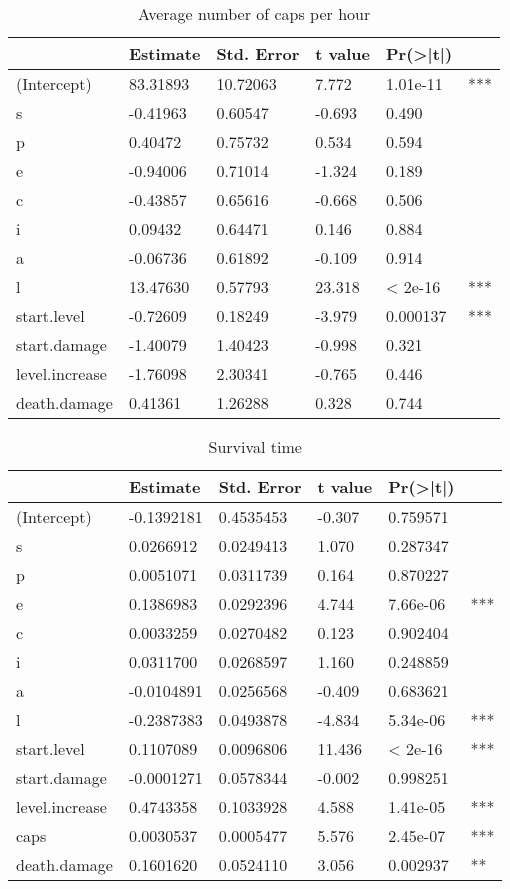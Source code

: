 \begin{table}
\caption{Average number of caps per hour}
\label{table:caps}
\begin{tabular}{l|lllll}
&Estimate&Std. Error&t value&Pr(>|t|)&\\  
\hline  
(Intercept)&83.31893  & 10.72063 &  7.772 &1.01e-11& ***\\
s &-0.41963  &  0.60547 & -0.693 &   0.490 &   \\
p& 0.40472  &  0.75732  & 0.534 &   0.594 &   \\
e & -0.94006  &  0.71014  &-1.324 &   0.189 &   \\
c&-0.43857  &  0.65616&  -0.668  &  0.506 &   \\
i& 0.09432  &  0.64471  & 0.146  &  0.884 &   \\
a  & -0.06736 &   0.61892 & -0.109 &   0.914&    \\
l &   13.47630  &  0.57793 & 23.318&  < 2e-16& ***\\
start.level &  -0.72609  &  0.18249 &  -3.979 &   0.000137 & *** \\ 
start.damage& -1.40079  &  1.40423 & -0.998 &   0.321 &  \\ 
level.increase & -1.76098 &   2.30341 & -0.765 &   0.446 &  \\ 
death.damage & 0.41361  & 1.26288 &  0.328  &  0.744&\\
\hline
\end{tabular}
\end{table}

\begin{table}
\label{table:survival.time}
\caption{Survival time}
\begin{tabular}{l|lllll}
&Estimate&Std. Error&t value& Pr(>|t|)&  \\ 
\hline 
(Intercept)&-0.1392181 & 0.4535453 & -0.307& 0.759571 &  \\ 
s&0.0266912 & 0.0249413 &  1.070& 0.287347 &   \\
p&0.0051071 & 0.0311739 &  0.164& 0.870227 &   \\
e&0.1386983 & 0.0292396 &  4.744& 7.66e-06 &***\\
c&0.0033259 & 0.0270482 &  0.123 &0.902404 & \\  
i&0.0311700 & 0.0268597 &  1.160& 0.248859 & \\  
a&-0.0104891 & 0.0256568 & -0.409& 0.683621 &  \\ 
l&-0.2387383 & 0.0493878 & -4.834& 5.34e-06 &***\\
start.level& 0.1107089 & 0.0096806 & 11.436& < 2e-16& ***\\
start.damage&-0.0001271 & 0.0578344 & -0.002& 0.998251&  \\ 
level.increase&  0.4743358 & 0.1033928 &  4.588& 1.41e-05& ***\\
caps&0.0030537 & 0.0005477  & 5.576& 2.45e-07 &***\\
death.damage & 0.1601620 & 0.0524110  & 3.056& 0.002937& ** \\
\hline
\end{tabular}
\end{table}


